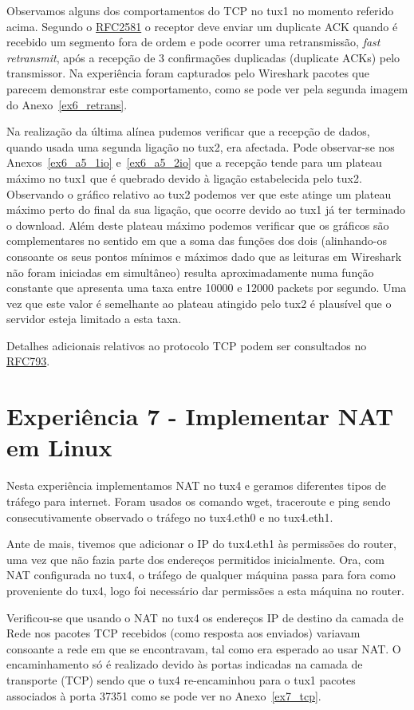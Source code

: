 \documentclass[11pt,a4paper,reqno]{report}
\numberwithin{equation}{section}
\begin{document}
Observamos alguns dos comportamentos do TCP no tux1 no momento referido acima. Segundo o \href{http://www.ietf.org/rfc/rfc2581.txt}{RFC2581} o receptor deve enviar um duplicate ACK quando é recebido um segmento fora de ordem e pode ocorrer uma retransmissão, \emph{fast retransmit}, após a recepção de 3 confirmações duplicadas (duplicate ACKs) pelo transmissor. Na experiência foram capturados pelo Wireshark pacotes que parecem demonstrar este comportamento, como se pode ver pela segunda imagem do Anexo~\ref{ex6_retrans}.

Na realização da última alínea pudemos verificar que a recepção de dados, quando usada uma segunda ligação no tux2, era afectada. Pode observar-se nos Anexos~\ref{ex6_a5_1io} e~\ref{ex6_a5_2io} que a recepção tende para um plateau máximo no tux1 que é quebrado devido à ligação estabelecida pelo tux2. Observando o gráfico relativo ao tux2 podemos ver que este atinge um plateau máximo perto do final da sua ligação, que ocorre devido ao tux1 já ter terminado o download. Além deste plateau máximo podemos verificar que os gráficos são complementares no sentido em que a soma das funções dos dois (alinhando-os consoante os seus pontos mínimos e máximos dado que as leituras em Wireshark não foram iniciadas em simultâneo) resulta aproximadamente numa função constante que apresenta uma taxa entre 10000 e 12000 packets por segundo. Uma vez que este valor é semelhante ao plateau atingido pelo tux2 é plausível que o servidor esteja limitado a esta taxa.

Detalhes adicionais relativos ao protocolo TCP podem ser consultados no \href{https://www.ietf.org/rfc/rfc793.txt}{RFC793}.

\section{Experiência 7 - Implementar NAT em Linux}

Nesta experiência implementamos NAT no tux4 e geramos diferentes tipos de tráfego para internet. Foram usados os comando wget, traceroute e ping sendo consecutivamente observado o tráfego no tux4.eth0 e no tux4.eth1.

Ante de mais, tivemos que adicionar o IP do tux4.eth1 às permissões do router, uma vez que não fazia parte dos endereços permitidos inicialmente. Ora, com NAT configurada no tux4, o tráfego de qualquer máquina passa para fora como proveniente do tux4, logo foi necessário dar permissões a esta máquina no router. 

Verificou-se que usando o NAT no tux4 os endereços IP de destino da camada de Rede nos pacotes TCP recebidos (como resposta aos enviados) variavam consoante a rede em que se encontravam, tal como era esperado ao usar NAT. O encaminhamento só é realizado devido às portas indicadas na camada de transporte (TCP) sendo que o tux4 re-encaminhou para o tux1 pacotes associados à porta 37351 como se pode ver no Anexo~\ref{ex7_tcp}.
\end{document}
